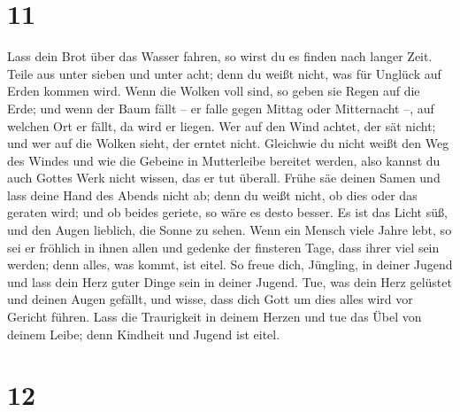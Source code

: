 \hypertarget{section-10}{%
\section{11}\label{section-10}}

 Lass dein Brot über das Wasser fahren, so wirst du es
finden nach langer Zeit.  Teile aus unter sieben und unter
acht; denn du weißt nicht, was für Unglück auf Erden kommen wird.
 Wenn die Wolken voll sind, so geben sie Regen auf die
Erde; und wenn der Baum fällt -- er falle gegen Mittag oder Mitternacht
--, auf welchen Ort er fällt, da wird er liegen.  Wer auf
den Wind achtet, der sät nicht; und wer auf die Wolken sieht, der erntet
nicht.  Gleichwie du nicht weißt den Weg des Windes und
wie die Gebeine in Mutterleibe bereitet werden, also kannst du auch
Gottes Werk nicht wissen, das er tut überall.  Frühe säe
deinen Samen und lass deine Hand des Abends nicht ab; denn du weißt
nicht, ob dies oder das geraten wird; und ob beides geriete, so wäre es
desto besser.  Es ist das Licht süß, und den Augen
lieblich, die Sonne zu sehen.  Wenn ein Mensch viele Jahre
lebt, so sei er fröhlich in ihnen allen und gedenke der finsteren Tage,
dass ihrer viel sein werden; denn alles, was kommt, ist eitel.
 So freue dich, Jüngling, in deiner Jugend und lass dein
Herz guter Dinge sein in deiner Jugend. Tue, was dein Herz gelüstet und
deinen Augen gefällt, und wisse, dass dich Gott um dies alles wird vor
Gericht führen.  Lass die Traurigkeit in deinem Herzen
und tue das Übel von deinem Leibe; denn Kindheit und Jugend ist eitel.

\hypertarget{section-11}{%
\section{12}\label{section-11}}

